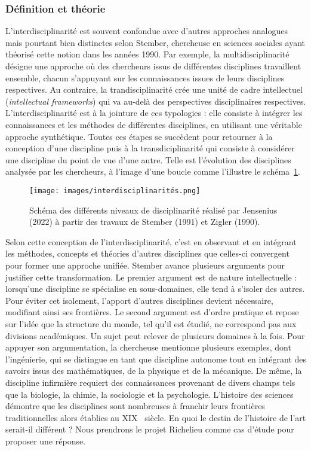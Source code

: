 \subsubsection{Définition et théorie}
L'interdisciplinarité est souvent confondue avec d'autres approches analogues mais pourtant bien distinctes selon  Stember, chercheuse en sciences sociales ayant théorisé cette notion dans les années 1990. Par exemple, la multidisciplinarité désigne une approche où des chercheurs issus de différentes disciplines travaillent ensemble, chacun s'appuyant sur les connaissances issues de leurs disciplines respectives. Au contraire, la trandisciplinarité crée une unité de cadre intellectuel (\textit{intellectual frameworks}) qui va au-delà des perspectives disciplinaires respectives. L'interdisciplinarité est à la jointure de ces typologies : elle consiste à intégrer les connaissances et les méthodes de différentes disciplines, en utilisant une véritable approche synthétique. Toutes ces étapes se succèdent pour retourner à la conception d'une discipline puis à la transdiciplinarité qui consiste à considérer une discipline du point de vue d'une autre. Telle est l'évolution des disciplines analysée par les chercheurs, à l'image d'une boucle comme l'illustre le schéma~\ref{fig:interdisciplinarite}.

\begin{figure}[ht!]
    \centering
    \texttt{[image: images/interdisciplinarités.png]}
    \caption{Schéma des différents niveaux de disciplinarité réalisé par Jensenius (2022) à partir des travaux de Stember (1991) et Zigler (1990).}
    \label{fig:interdisciplinarite}
\end{figure}

Selon cette conception de l'interdisciplinarité, c’est en observant et en intégrant les méthodes, concepts et théories d'autres disciplines que celles-ci convergent pour former une approche unifiée. Stember avance plusieurs arguments pour justifier cette transformation. Le premier argument est de nature intellectuelle : lorsqu'une discipline se spécialise en sous-domaines, elle tend à s'isoler des autres. Pour éviter cet isolement, l'apport d'autres disciplines devient nécessaire, modifiant ainsi ses frontières. Le second argument est d'ordre pratique et repose sur l'idée que la structure du monde, tel qu'il est étudié, ne correspond pas aux divisions académiques. Un sujet peut relever de plusieurs domaines à la fois. Pour appuyer son argumentation, la chercheuse mentionne plusieurs exemples, dont l'ingénierie, qui se distingue en tant que discipline autonome tout en intégrant des savoirs issus des mathématiques, de la physique et de la mécanique. De même, la discipline infirmière requiert des connaissances provenant de divers champs tels que la biologie, la chimie, la sociologie et la psychologie. L'histoire des sciences démontre que les disciplines sont nombreuses à franchir leurs frontières traditionnelles alors établies au XIX\ieme~ siècle. En quoi le destin de l'histoire de l'art serait-il différent ? Nous prendrons le projet Richelieu comme cas d'étude pour proposer une réponse.

